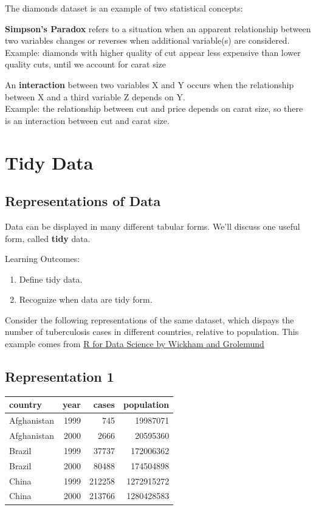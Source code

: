 \documentclass[]{book}
\begin{document}
The diamonds dataset is an example of two statistical concepts:

\textbf{Simpson's Paradox} refers to a situation when an apparent
relationship between two variables changes or reverses when additional
variable(s) are considered.\\
Example: diamonds with higher quality of cut appear less expensive than
lower quality cuts, until we account for carat size

An \textbf{interaction} between two variables X and Y occurs when the
relationship between X and a third variable Z depends on Y.\\
Example: the relationship between cut and price depends on carat size,
so there is an interaction between cut and carat size.

\section{Tidy Data}\label{tidy-data}

\subsection{Representations of Data}\label{representations-of-data}

Data can be displayed in many different tabular forms. We'll discuss one
useful form, called \textbf{tidy} data.

Learning Outcomes:

\begin{enumerate}
\def\labelenumi{\arabic{enumi}.}
\item
  Define tidy data.
\item
  Recognize when data are tidy form.
\end{enumerate}

Consider the following representations of the same dataset, which
dispays the number of tuberculosis cases in different countries,
relative to population. This example comes from
\href{https://r4ds.had.co.nz/tidy-data.html}{R for Data Science by
Wickham and Grolemund}

\subsection{Representation 1}\label{representation-1}

\begin{tabular}{l|r|r|r}
\hline
country & year & cases & population\\
\hline
Afghanistan & 1999 & 745 & 19987071\\
\hline
Afghanistan & 2000 & 2666 & 20595360\\
\hline
Brazil & 1999 & 37737 & 172006362\\
\hline
Brazil & 2000 & 80488 & 174504898\\
\hline
China & 1999 & 212258 & 1272915272\\
\hline
China & 2000 & 213766 & 1280428583\\
\hline
\end{tabular}
\end{document}
